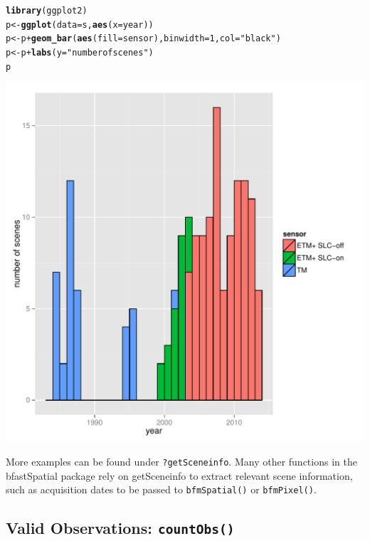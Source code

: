 \documentclass{article}\usepackage[]{graphicx}\usepackage[]{color}
\makeatletter
\def\maxwidth{ %
  \ifdim\Gin@nat@width>\linewidth
    \linewidth
  \else
    \Gin@nat@width
  \fi
}
\newcommand{\hlnum}[1]{\textcolor[rgb]{0.686,0.059,0.569}{#1}}%
\newcommand{\hlstr}[1]{\textcolor[rgb]{0.192,0.494,0.8}{#1}}%
\newcommand{\hlopt}[1]{\textcolor[rgb]{0,0,0}{#1}}%
\newcommand{\hlstd}[1]{\textcolor[rgb]{0.345,0.345,0.345}{#1}}%
\newcommand{\hlkwb}[1]{\textcolor[rgb]{0.69,0.353,0.396}{#1}}%
\newcommand{\hlkwc}[1]{\textcolor[rgb]{0.333,0.667,0.333}{#1}}%
\newcommand{\hlkwd}[1]{\textcolor[rgb]{0.737,0.353,0.396}{\textbf{#1}}}%
\newenvironment{kframe}{%
 \def\at@end@of@kframe{}%
 \ifinner\ifhmode%
  \def\at@end@of@kframe{\end{minipage}}%
  \begin{minipage}{\columnwidth}%
 \fi\fi%
 \def\FrameCommand##1{\hskip\@totalleftmargin \hskip-\fboxsep
 \colorbox{shadecolor}{##1}\hskip-\fboxsep
     \hskip-\linewidth \hskip-\@totalleftmargin \hskip\columnwidth}%
 \MakeFramed {\advance\hsize-\width
   \@totalleftmargin\z@ \linewidth\hsize
   \@setminipage}}%
 {\par\unskip\endMakeFramed%
 \at@end@of@kframe}
\newenvironment{knitrout}{}{} %
\def\code#1{\texttt{#1}}
\makeatother
\begin{document}
\begin{knitrout}
\color{fgcolor}\begin{kframe}
\begin{alltt}
\hlkwd{library}\hlstd{(ggplot2)}
\hlstd{p} \hlkwb{<-} \hlkwd{ggplot}\hlstd{(}\hlkwc{data} \hlstd{= s,} \hlkwd{aes}\hlstd{(}\hlkwc{x} \hlstd{= year))}
\hlstd{p} \hlkwb{<-} \hlstd{p} \hlopt{+} \hlkwd{geom_bar}\hlstd{(}\hlkwd{aes}\hlstd{(}\hlkwc{fill} \hlstd{= sensor),} \hlkwc{binwidth} \hlstd{=} \hlnum{1}\hlstd{,} \hlkwc{col} \hlstd{=} \hlstr{"black"}\hlstd{)}
\hlstd{p} \hlkwb{<-} \hlstd{p} \hlopt{+} \hlkwd{labs}\hlstd{(}\hlkwc{y} \hlstd{=} \hlstr{"number of scenes"}\hlstd{)}
\hlstd{p}
\end{alltt}
\end{kframe}
\includegraphics[width=\maxwidth]{figure/getSceneinfo-ggplot} 

\end{knitrout}


More examples can be found under \code{?getSceneinfo}. Many other functions in the bfastSpatial package rely on getSceneinfo to extract relevant scene information, such as acquisition dates to be passed to \code{bfmSpatial()} or \code{bfmPixel()}.

\subsection{Valid Observations: \code{countObs()}}
\end{document}

